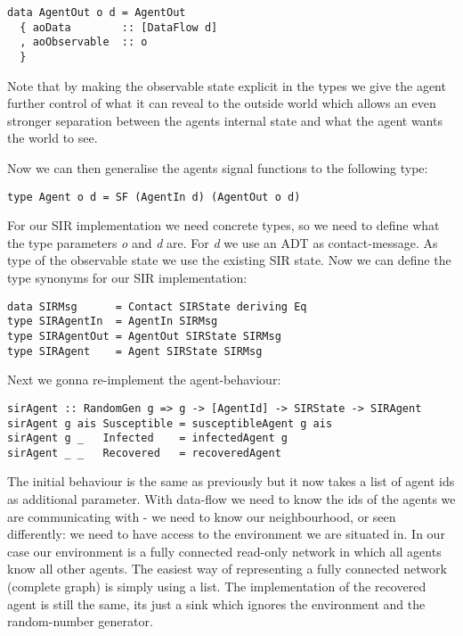 \begin{verbatim}
data AgentOut o d = AgentOut
  { aoData        :: [DataFlow d]
  , aoObservable  :: o
  }
\end{verbatim}

Note that by making the observable state explicit in the types we give the agent further control of what it can reveal to the outside world which allows an even stronger separation between the agents internal state and what the agent wants the world to see.

Now we can then generalise the agents signal functions to the following type:
\begin{verbatim}
type Agent o d = SF (AgentIn d) (AgentOut o d)
\end{verbatim}

For our SIR implementation we need concrete types, so we need to define what the type parameters \textit{o} and \textit{d} are. For \textit{d} we use an ADT as contact-message. As type of the observable state we use the existing SIR state. Now we can define the type synonyms for our SIR implementation:
\begin{verbatim}
data SIRMsg      = Contact SIRState deriving Eq
type SIRAgentIn  = AgentIn SIRMsg
type SIRAgentOut = AgentOut SIRState SIRMsg
type SIRAgent    = Agent SIRState SIRMsg
\end{verbatim}

Next we gonna re-implement the agent-behaviour:

\begin{verbatim}
sirAgent :: RandomGen g => g -> [AgentId] -> SIRState -> SIRAgent
sirAgent g ais Susceptible = susceptibleAgent g ais
sirAgent g _   Infected    = infectedAgent g
sirAgent _ _   Recovered   = recoveredAgent
\end{verbatim}

The initial behaviour is the same as previously but it now takes a list of agent ids as additional parameter. With data-flow we need to know the ids of the agents we are communicating with - we need to know our neighbourhood, or seen differently: we need to have access to the environment we are situated in. In our case our environment is a fully connected read-only network in which all agents know all other agents. The easiest way of representing a fully connected network (complete graph) is simply using a list. 
The implementation of the recovered agent is still the same, its just a sink which ignores the environment and the random-number generator. 

